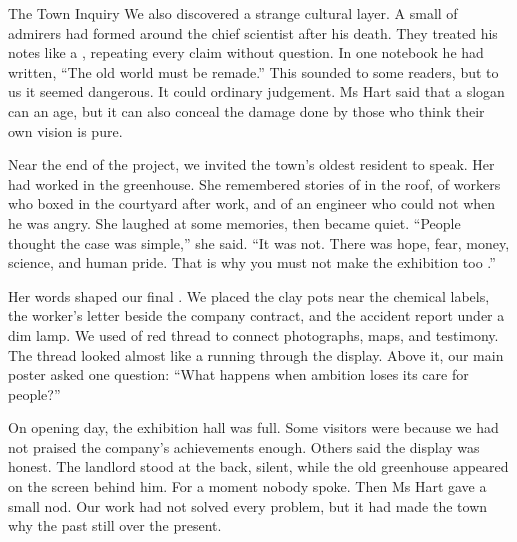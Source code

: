 \documentclass[12pt]{nextbook}
\begin{document}
\begin{readersection}{The Town Inquiry}
We also discovered a strange cultural layer. A small  of admirers had formed around the chief scientist after his death. They treated his notes like a , repeating every claim without question. In one notebook he had written, “The old world must be remade.” This sounded  to some readers, but to us it seemed dangerous. It could  ordinary judgement. Ms Hart said that a slogan can  an age, but it can also conceal the damage done by those who think their own vision is pure.

Near the end of the project, we invited the town’s oldest resident to speak. Her  had worked in the greenhouse. She remembered stories of  in the roof, of workers who boxed in the courtyard after work, and of an engineer who could not  when he was angry. She laughed at some memories, then became quiet. “People thought the case was simple,” she said. “It was not. There was hope, fear, money, science, and human pride. That is why you must not make the exhibition too .”

Her words shaped our final . We placed the clay pots near the chemical labels, the worker’s letter beside the company contract, and the accident report under a dim lamp. We used  of red thread to connect photographs, maps, and testimony. The thread looked almost like a  running through the display. Above it, our main poster asked one question: “What happens when ambition loses its care for people?”

On opening day, the exhibition hall was full. Some visitors were  because we had not praised the company’s achievements enough. Others said the display was honest. The landlord stood at the back, silent, while the old greenhouse appeared on the screen behind him. For a moment nobody spoke. Then Ms Hart gave a small nod. Our work had not solved every problem, but it had made the town  why the past still  over the present.
\end{readersection}
\end{document}
